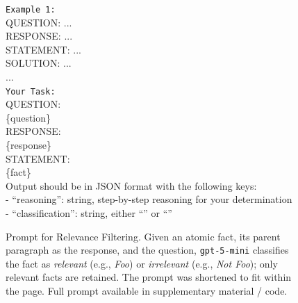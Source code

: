 \documentclass{article}
\begin{document}
\begin{figure}[t]
\begin{small}
\begin{tcolorbox}[
    colback=gray!5,
    colframe=black,
    width=\linewidth,
    arc=2mm,
    boxrule=0.5pt,
    title=\textbf{Atomic Fact Generation (Step 4): Relevance Filtering Prompt}
]
\texttt{Example 1:}\\
QUESTION: ...\\
RESPONSE: ...\\
STATEMENT: ...\\
SOLUTION: ...\\
...\\

\texttt{Your Task:}\\
QUESTION:\\
\{question\}\\
RESPONSE:\\
\{response\}\\
STATEMENT:\\
\{fact\}\\

Output should be in JSON format with the following keys:\\
- ``reasoning'': string, step-by-step reasoning for your determination\\
- ``classification'': string, either ``\text{[Foo]}'' or ``''
\end{tcolorbox}

\caption{Prompt for Relevance Filtering. Given an atomic fact, its parent paragraph as the response, and the question, \texttt{gpt-5-mini} classifies the fact as \textit{relevant} (e.g., \textit{Foo}) or \textit{irrelevant} (e.g., \textit{Not Foo}); only relevant facts are retained. The prompt was shortened to fit within the page. Full prompt available in supplementary material / code.}
\label{fig:irrelevant-fact-prompt}
\end{small}
\end{figure}

\clearpage
\end{document}
